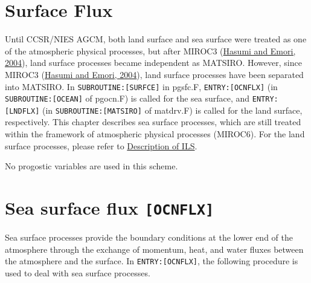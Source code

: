 \hypertarget{surface-flux}{%
\section{Surface Flux}\label{surface-flux}}

Until CCSR/NIES AGCM, both land surface and sea surface were treated as
one of the atmospheric physical processes, but after MIROC3
(\href{https://ccsr.aori.u-tokyo.ac.jp/~hasumi/miroc_description.pdf}{Hasumi
and Emori, 2004}), land surface processes became independent as MATSIRO.
However, since MIROC3
(\href{https://ccsr.aori.u-tokyo.ac.jp/~hasumi/miroc_description.pdf}{Hasumi
and Emori, 2004}), land surface processes have been separated into
MATSIRO. In \texttt{SUBROUTINE:{[}SURFCE{]}} in pgsfc.F,
\texttt{ENTRY:{[}OCNFLX{]}} (in \texttt{SUBROUTINE:{[}OCEAN{]}} of
pgocn.F) is called for the sea surface, and \texttt{ENTRY:{[}LNDFLX{]}}
(in \texttt{SUBROUTINE:{[}MATSIRO{]}} of matdrv.F) is called for the
land surface, respectively. This chapter describes sea surface
processes, which are still treated within the framework of atmospheric
physical processes (MIROC6). For the land surface processes, please
refer to
\href{https://github.com/integrated-land-simulator/model_description}{Description
of ILS}.

No progostic variables are used in this scheme.

\hypertarget{sea-surface-flux-ocnflx}{%
\section{\texorpdfstring{Sea surface flux
\texttt{{[}OCNFLX{]}}}{Sea surface flux {[}OCNFLX{]}}}\label{sea-surface-flux-ocnflx}}

Sea surface processes provide the boundary conditions at the lower end
of the atmosphere through the exchange of momentum, heat, and water
fluxes between the atmosphere and the surface. In
\texttt{ENTRY:{[}OCNFLX{]}}, the following procedure is used to deal
with sea surface processes.

